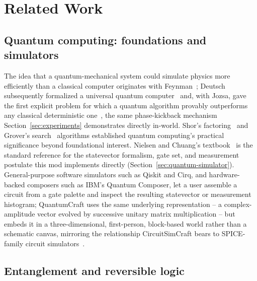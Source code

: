 \section{Related Work}
\label{sec:related-work}

\subsection{Quantum computing: foundations and simulators}

The idea that a quantum-mechanical system could simulate physics more efficiently than a
classical computer originates with Feynman~\cite{feynman1982simulating}; Deutsch subsequently
formalized a universal quantum computer~\cite{deutsch1985quantum} and, with Jozsa, gave the
first explicit problem for which a quantum algorithm provably outperforms any classical
deterministic one~\cite{deutschjozsa1992rapid}, the same phase-kickback mechanism
Section~\ref{sec:experiments} demonstrates directly in-world. Shor's
factoring~\cite{shor1997polynomial} and Grover's search~\cite{grover1996fast} algorithms
established quantum computing's practical significance beyond foundational interest.
Nielsen and Chuang's textbook~\cite{nielsenchuang2010} is the standard reference for the
statevector formalism, gate set, and measurement postulate this mod implements directly
(Section~\ref{sec:quantum-simulator}). General-purpose software simulators such as Qiskit and
Cirq, and hardware-backed composers such as IBM's Quantum Composer, let a user assemble a
circuit from a gate palette and inspect the resulting statevector or measurement histogram;
QuantumCraft uses the same underlying representation -- a complex-amplitude vector evolved by
successive unitary matrix multiplication -- but embeds it in a three-dimensional, first-person,
block-based world rather than a schematic canvas, mirroring the relationship CircuitSimCraft
bears to SPICE-family circuit simulators~\cite{picos2026circuitsimcraft}.

\subsection{Entanglement and reversible logic}

